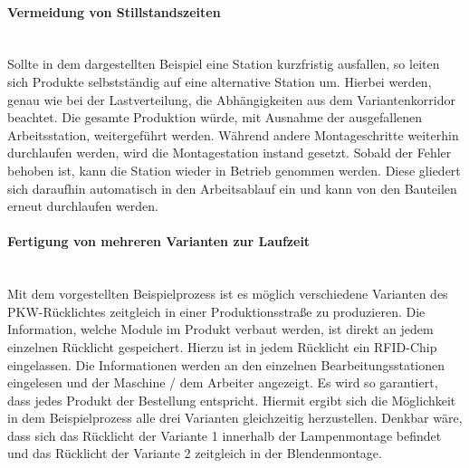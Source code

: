 \paragraph{Vermeidung von Stillstandszeiten}\hfill \\
Sollte in dem dargestellten Beispiel eine Station kurzfristig ausfallen, so
leiten sich Produkte selbstständig auf eine alternative Station um. Hierbei 
werden, genau wie bei der Lastverteilung, die Abhängigkeiten aus dem
Variantenkorridor beachtet. Die gesamte Produktion würde, mit Ausnahme der
ausgefallenen Arbeitsstation, weitergeführt werden. Während andere
Montageschritte weiterhin durchlaufen werden, wird die Montagestation instand
gesetzt. Sobald der Fehler behoben ist, kann die Station wieder in Betrieb
genommen werden. Diese gliedert sich daraufhin automatisch in den Arbeitsablauf
ein und kann von den Bauteilen erneut durchlaufen werden.

\paragraph{Fertigung von mehreren Varianten zur Laufzeit} \hfill \\
Mit dem vorgestellten Beispielprozess ist es möglich verschiedene Varianten des
PKW-Rücklichtes zeitgleich in einer Produktionsstraße zu produzieren. Die
Information, welche Module im Produkt verbaut werden, ist direkt an jedem
einzelnen Rücklicht gespeichert. Hierzu ist in jedem Rücklicht ein RFID-Chip
eingelassen. Die Informationen werden an den einzelnen Bearbeitungsstationen
eingelesen und der Maschine / dem Arbeiter angezeigt. Es wird so garantiert,
dass jedes Produkt der Bestellung entspricht. Hiermit ergibt sich die
Möglichkeit in dem Beispielprozess alle drei Varianten gleichzeitig
herzustellen. Denkbar wäre, dass sich das Rücklicht der Variante 1 innerhalb
der Lampenmontage befindet und das Rücklicht der Variante 2 zeitgleich in der
Blendenmontage.

